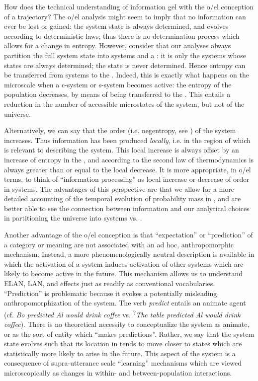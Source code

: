 How does the technical understanding of information gel with the o/el conception of a  trajectory? The o/el analysis might seem to imply that no information can ever be lost or gained: the system state is always determined, and evolves according to deterministic laws; thus there is no determination process which allows for a change in entropy. However, consider that our analyses always partition the full system state into systems and a : it is only the systems whose states are always determined; the  state is never determined. Hence entropy can be transferred from systems to the . Indeed, this is exactly what happens on the microscale when a c-system or s-system becomes active: the entropy of the population decreases, by means of being transferred to the . This entails a reduction in the number of accessible microstates of the system, but not of the universe.

Alternatively, we can say that the order (i.e. negentropy, see \citealt{Schrödinger1944}) of the system increases. Thus information has been produced \textit{locally}, i.e. in the region of  which is relevant to describing the system. This local increase is always offset by an increase of entropy in the , and according to the second law of thermodynamics is always greater than or equal to the local decrease. It is more appropriate, in o/el terms, to think of “information processing” as local increase or decrease of order in systems. The advantages of this perspective are that we allow for a more detailed accounting of the temporal evolution of probability mass in , and are better able to see the connection between information and our analytical choices in partitioning the universe into systems vs. . 

Another advantage of the o/el conception is that “expectation” or “prediction” of a category or meaning are not associated with an ad hoc, anthropomorphic mechanism. Instead, a more phenomenologically neutral description is available in which the activation of a system induces activation of other systems which are likely to become active in the future. This mechanism allows us to understand ELAN, LAN, and  effects just as readily as conventional vocabularies. “Prediction” is problematic because it evokes a potentially misleading anthropomorphization of the system. The verb \textit{predict} entails an animate agent (cf. \textit{Bo predicted Al would drink coffee} vs. \textsuperscript{?}\textit{The table predicted Al would drink coffee}). There is no theoretical necessity to conceptualize the system as animate, or as the sort of entity which “makes predictions”. Rather, we say that the system state evolves such that its location in  tends to move closer to states which are statistically more likely to arise in the future. This aspect of the system is a consequence of supra-utterance scale “learning” mechanisms which are viewed microscopically as changes in within- and between-population interactions.

